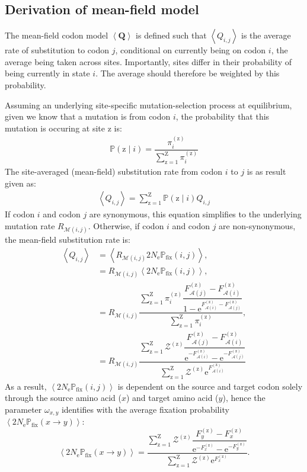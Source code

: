 \documentclass{article}
\newcommand{\BiDimArray}[1]{\bm{#1}}
\newcommand{\e}{\text{e}}
\newcommand{\Ne}{N_{\text{e}}}
\newcommand{\proba}{\mathbb{P}}
\newcommand{\Pfix}{2 \Ne \proba_{\text{fix}}}
\newcommand{\mutmatrix}{R}
\newcommand{\ci}{{i}}
\newcommand{\cj}{{j}}
\newcommand{\itoj}{\ci, \cj}
\newcommand{\nuc}{\mathcal{M}}
\newcommand{\nucitoj}{\nuc(\itoj)}
\newcommand{\submatrix}{Q}
\newcommand{\Submatrix}{\BiDimArray{\submatrix}}
\newcommand{\subequi}{\pi}
\newcommand{\aaSource}{x}
\newcommand{\aaTarget}{y}
\newcommand{\aaMap}{\mathcal{A}}
\newcommand{\aai}{\aaMap(\ci)}
\newcommand{\aaj}{\aaMap(\cj)}
\newcommand{\avgpfixAA}{\left\langle \Pfix \left( \aaSource \to \aaTarget \right) \right\rangle }
\newcommand{\scaledfit}{F}
\newcommand{\FitaaSource}{\scaledfit_{\aaSource}}
\newcommand{\FitaaTarget}{\scaledfit_{\aaTarget}}
\newcommand{\Fiti}{\scaledfit_{\aai}}
\newcommand{\Fitj}{\scaledfit_{\aaj}}
\newcommand{\site}{\text{z}}
\newcommand{\Nsite}{\text{Z}}
\newcommand{\siteexp}{^{(\site)}}
\newcommand{\sumSetsite}{_{\site=1}^{\Nsite} }
\begin{document}
\subsection{Derivation of mean-field model}
\label{subsec:mean-field-derivation}
The mean-field codon model $\left\langle \Submatrix \right\rangle$ is defined such that $\left\langle \submatrix_{\itoj} \right\rangle$ is the average rate of {substitution} to codon $\cj$, conditional on currently being on codon $\ci$, the average being taken across sites.
Importantly, sites differ in their probability of being currently in state $\ci$.
The average should therefore be weighted by this probability.

Assuming an underlying site-specific mutation-selection process at equilibrium, given we know that a mutation is from codon $\ci$, the probability that this mutation is occuring at site $\site$ is:
\begin{align}
 \proba (\site \mid \ci) = \dfrac{ \subequi_{\ci}\siteexp }{\sum\limits\sumSetsite \subequi_{\ci}\siteexp }
\end{align}
The site-averaged (mean-field) {substitution} rate from codon $\ci$ to $\cj$ is as result given as:
\begin{align}
 \left\langle \submatrix_{\itoj} \right\rangle = \sum\limits\sumSetsite \proba (\site \mid \ci) \submatrix_{\itoj}
\end{align}
If codon $\ci$ and codon $\cj$ are {synonymous}, this equation simplifies to the underlying mutation rate $\mutmatrix_{\nucitoj}$.
Otherwise, if codon $\ci$ and codon $\cj$ are {non-synonymous}, the mean-field {substitution} rate is:
\begin{align}
 \left\langle \submatrix_{\itoj} \right\rangle & = \left\langle \mutmatrix_{\nucitoj} \Pfix (\itoj) \right\rangle, \\
 & = \mutmatrix_{\nucitoj} \left\langle \Pfix (\itoj) \right\rangle, \\
 & = \mutmatrix_{\nucitoj} \dfrac{ \sum\limits\sumSetsite \subequi_{\ci}\siteexp \dfrac{\Fitj\siteexp - \Fiti\siteexp}{1 - \e^{\Fiti\siteexp - \Fitj\siteexp}} }{ \sum\limits\sumSetsite \subequi_{\ci}\siteexp }, \\
 & = \mutmatrix_{\nucitoj} \dfrac{ \sum\limits\sumSetsite \mathcal{Z}\siteexp \dfrac{\Fitj\siteexp - \Fiti\siteexp}{ \e^{-\Fiti\siteexp} - \e^{ - \Fitj\siteexp}} }{ \sum\limits\sumSetsite \mathcal{Z}\siteexp \e^{\Fiti\siteexp} }
\end{align}
As a result, $\left\langle \Pfix (\itoj) \right\rangle$ is dependent on the source and target codon solely through the source amino acid ($\aaSource$) and target amino acid ($\aaTarget$), hence the parameter $\omega_{\aaSource, \aaTarget}$ identifies with the average fixation probability $\avgpfixAA$:
\begin{equation}
 \label{eq:omega_pairs_predicted} \avgpfixAA = \dfrac{ \sum\limits\sumSetsite \mathcal{Z}\siteexp \dfrac{\FitaaTarget\siteexp - \FitaaSource\siteexp}{ \e^{-\FitaaSource\siteexp} - \e^{ - \FitaaTarget\siteexp}} }{ \sum\limits\sumSetsite \mathcal{Z}\siteexp \e^{\FitaaSource\siteexp} }.
\end{equation}
\end{document}
